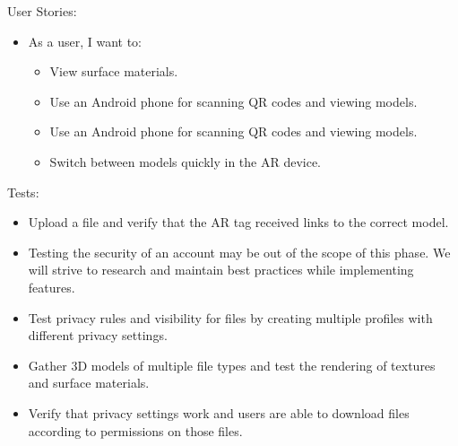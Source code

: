 User Stories:
\begin{itemize}
	\item As a user, I want to:
	\begin{itemize}
		\item View surface materials.
		\item Use an Android phone for scanning QR codes and viewing models.
		\item Use an Android phone for scanning QR codes and viewing models.
		\item Switch between models quickly in the AR device.
	\end{itemize}
\end{itemize}
Tests:
\begin{itemize}
	\item Upload a file and verify that the AR tag received links to the correct
	model.
	\item Testing the security of an account may be out of the scope of this 
	phase. We will strive to research and maintain best practices while 
	implementing features.
	\item Test privacy rules and visibility for files by creating multiple 
	profiles with different privacy settings.
	\item Gather 3D models of multiple file types and test the rendering of 
	textures and surface materials.
	\item Verify that privacy settings work and users are able to download files
	according to permissions on those files.
\end{itemize}